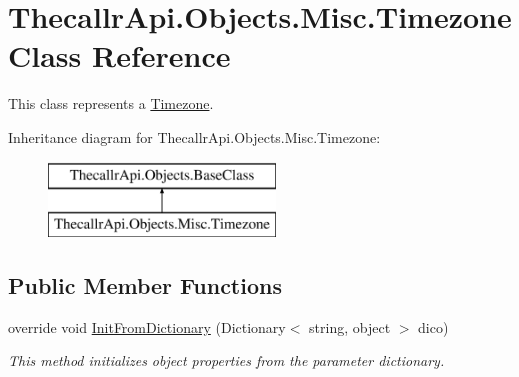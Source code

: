 \hypertarget{class_thecallr_api_1_1_objects_1_1_misc_1_1_timezone}{\section{Thecallr\+Api.\+Objects.\+Misc.\+Timezone Class Reference}
\label{class_thecallr_api_1_1_objects_1_1_misc_1_1_timezone}
}


This class represents a \hyperlink{class_thecallr_api_1_1_objects_1_1_misc_1_1_timezone}{Timezone}.  


Inheritance diagram for Thecallr\+Api.\+Objects.\+Misc.\+Timezone\+:\begin{figure}[H]
\begin{center}
\leavevmode
\includegraphics[height=2.000000cm]{class_thecallr_api_1_1_objects_1_1_misc_1_1_timezone}
\end{center}
\end{figure}
\subsection*{Public Member Functions}
\begin{DoxyCompactItemize}
\item 
override void \hyperlink{class_thecallr_api_1_1_objects_1_1_misc_1_1_timezone_a3edb8b95b32e89329ba93482b0abb2c7}{Init\+From\+Dictionary} (Dictionary$<$ string, object $>$ dico)
\begin{DoxyCompactList}\small\item\em This method initializes object properties from the parameter dictionary. \end{DoxyCompactList}\end{DoxyCompactItemize}
